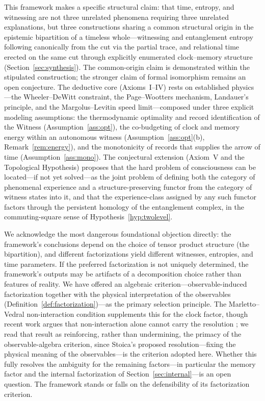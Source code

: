 \documentclass[11pt, a4paper]{article}
\begin{document}
This framework makes a specific structural claim: that time, entropy, and witnessing are not three unrelated phenomena requiring three unrelated explanations, but three constructions sharing a common structural origin in the epistemic bipartition of a timeless whole---witnessing and entanglement entropy following canonically from the cut via the partial trace, and relational time erected on the same cut through explicitly enumerated clock--memory structure (Section~\ref{sec:synthesis}). The common-origin claim is demonstrated within the stipulated construction; the stronger claim of formal isomorphism remains an open conjecture. The deductive core (Axioms~I--IV) rests on established physics---the Wheeler--DeWitt constraint, the Page--Wootters mechanism, Landauer's principle, and the Margolus--Levitin speed limit---composed under three explicit modeling assumptions: the thermodynamic optimality and record identification of the Witness (Assumption~\ref{ass:opt}), the co-budgeting of clock and memory energy within an autonomous witness (Assumption~\ref{ass:opt}(b), Remark~\ref{rem:energy}), and the monotonicity of records that supplies the arrow of time (Assumption~\ref{ass:mono}). The conjectural extension (Axiom~V and the Topological Hypothesis) proposes that the hard problem of consciousness can be located---if not yet solved---as the joint problem of defining both the category of phenomenal experience and a structure-preserving functor from the category of witness states into it, and that the experience-class assigned by any such functor factors through the persistent homology of the entanglement complex, in the commuting-square sense of Hypothesis~\ref{hyp:twolevel}.

We acknowledge the most dangerous foundational objection directly: the framework's conclusions depend on the choice of tensor product structure (the bipartition), and different factorizations yield different witnesses, entropies, and time parameters. If the preferred factorization is not uniquely determined, the framework's outputs may be artifacts of a decomposition choice rather than features of reality. We have offered an algebraic criterion---observable-induced factorization together with the physical interpretation of the observables (Definition~\ref{def:factorization})---as the primary selection principle. The Marletto--Vedral non-interaction condition \cite{Marletto2017} supplements this for the clock factor, though recent work argues that non-interaction alone cannot carry the resolution \cite{Stoica2026}; we read that result as reinforcing, rather than undermining, the primacy of the observable-algebra criterion, since Stoica's proposed resolution---fixing the physical meaning of the observables---is the criterion adopted here. Whether this fully resolves the ambiguity for the remaining factors---in particular the memory factor and the internal factorization of Section~\ref{sec:internal}---is an open question. The framework stands or falls on the defensibility of its factorization criterion.
\end{document}
